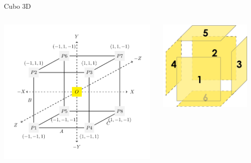 \documentclass[aspectratio=169,compress]{beamer}
\begin{document}
\begin{frame}{Cubo 3D}
\begin{columns}
\begin{column}{0.4\textwidth}
\begin{center}
  \includegraphics[width=0.98\textwidth]{FigsOpenGL/cube}
 \end{center}

\end{column}
\begin{column}{0.3\textwidth}
\begin{center}

 \includegraphics[width=0.98\textwidth]{FigsOpenGL/CarasCubo}
 \end{center}
\end{column}
\end{columns}

\end{frame}
\end{document}
